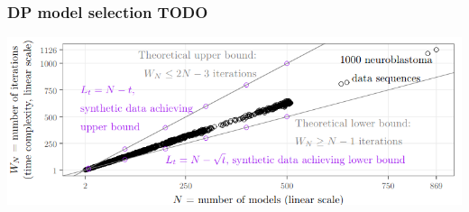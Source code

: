 \documentclass[t]{beamer}
\begin{document}
\begin{frame}
  \frametitle{DP model selection TODO}
  \includegraphics[width=\textwidth]{figure-dp-model-selection-iterations}
\end{frame}
\end{document}
